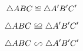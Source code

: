 \documentclass{ctexart}
\newcommand\backcong{\mathrel{\reflectbox{$\cong$}}}
\newcommand*\zhcong{%
	\mathrel{\text{%
			\tikz \draw[baseline] (-.2em,1.35ex) .. controls (-.46em,1.6ex) and (-.54em,.65ex) .. (-.25em,.65ex) .. controls (-.06em,.65ex) and (.06em,1.35ex) .. (.25em,1.35ex) .. controls (.54em,1.35ex) and (.46em,.4ex) .. (.2em,.65ex) (-.46em,.4ex) -- (.46em,.4ex) (-.46em,0ex) -- (.46em,0ex);%
}}}
\newcommand*\zhsim{%
	\mathrel{\text{%
			\tikz \draw[baseline] (-.25em,1.15ex) .. controls (-.55em,1.15ex) and (-.51em,.23ex) .. (-.275em,.23ex) .. controls (0,.23ex) and (0,1.15ex) .. (.275em,1.15ex) .. controls (.51em,1.15ex) and (.55em,.23ex) .. (.25em,.23ex);%
}}}
\begin{document}
	
\[
\triangle {ABC}\backcong{\triangle {A'B'C'}}
\]
	
\[
\triangle {ABC}\zhcong{\triangle {A'B'C'}}
\]

\[
\triangle {ABC}\zhsim{\triangle {A'B'C'}}
\]
\end{document}
